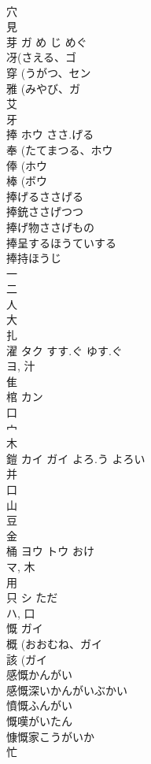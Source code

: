 \documentclass[8pt]{extreport}
\begin{document}
\begin{CJK}{UTF8}{min}
\\	穴 
\\	見 
\\	芽	ガ	め じ めぐ	
\\	冴(さえる、ゴ 
\\	穿 (うがつ、セン 
\\	雅 (みやび、ガ 
\\	艾 
\\	牙 
\\	捧	ホウ	ささ.げる	
\\	奉 (たてまつる、ホウ 
\\	俸 (ホウ 
\\	棒 (ボウ 
\\	捧げるささげる
\\	捧銃ささげつつ
\\	捧げ物ささげもの
\\	捧呈するほうていする
\\	捧持ほうじ
\\	一 
\\	二 
\\	人 
\\	大 
\\	扎	
\\	濯	タク	すす.ぐ ゆす.ぐ	
\\	ヨ, 汁 
\\	隹 
\\	棺	カン		
\\	口 
\\	宀 
\\	木 
\\	鎧	カイ ガイ	よろ.う よろい	
\\	并 
\\	口 
\\	山 
\\	豆 
\\	金 
\\	桶	ヨウ トウ	おけ	
\\	マ, 木 
\\	用 
\\	只	シ	ただ	
\\	ハ, 口 
\\	慨	ガイ		
\\	概 (おおむね、ガイ 
\\	該 (ガイ 
\\	感慨かんがい
\\	感慨深いかんがいぶかい
\\	憤慨ふんがい
\\	慨嘆がいたん
\\	慷慨家こうがいか
\\	忙 

\end{CJK}
\end{document}
